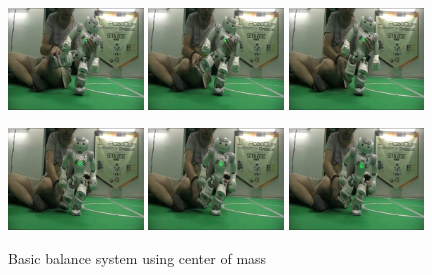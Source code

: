\begin{figure}[!h]
\centerline{
\includegraphics[width=0.32\textwidth]{Figures/Demo2/1.png}
\includegraphics[width=0.32\textwidth]{Figures/Demo2/2.png}
\includegraphics[width=0.32\textwidth]{Figures/Demo2/3.png}
}
\vspace*{0.06cm}
\centerline{
\includegraphics[width=0.32\textwidth]{Figures/Demo2/4.png}
\includegraphics[width=0.32\textwidth]{Figures/Demo2/5.png}
\includegraphics[width=0.32\textwidth]{Figures/Demo2/6.png}
}
\vspace{-0.1cm}
\caption{Basic balance system using center of mass}
\label{demo1}
\vspace*{0.5cm}
\end{figure}


